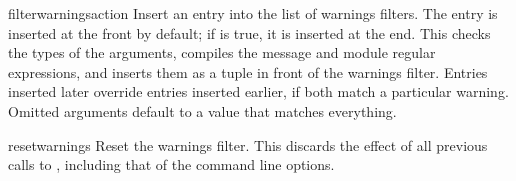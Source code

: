 \begin{funcdesc}{filterwarnings}{action}
Insert an entry into the list of warnings filters.  The entry is
inserted at the front by default; if  is true, it is
inserted at the end.
This checks the types of the arguments, compiles the message and
module regular expressions, and inserts them as a tuple in front
of the warnings filter.  Entries inserted later override entries
inserted earlier, if both match a particular warning.  Omitted
arguments default to a value that matches everything.
\end{funcdesc}

\begin{funcdesc}{resetwarnings}{}
Reset the warnings filter.  This discards the effect of all previous
calls to , including that of the
 command line options.
\end{funcdesc}
